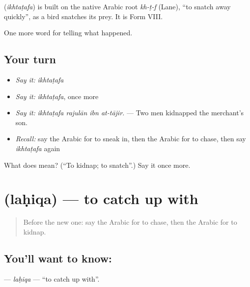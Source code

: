 \begin{cousinweb}
\textbf{} (\emph{ikhtaṭafa}) is built on the native Arabic root \emph{kh-ṭ-f} (Lane), \textquotedblleft{}to snatch away quickly\textquotedblright{}, as a bird snatches its prey. It is Form VIII.
\end{cousinweb}

\begin{grammarlens}[title={What you've built}]
One more word for telling what happened.
\end{grammarlens}

\subsection*{Your turn}
\begin{itemize}
\raggedright
  \item \emph{Say it:} \emph{ikhtaṭafa}
  \item \emph{Say it:} \emph{ikhtaṭafa}, once more
  \item \emph{Say it:} \emph{ikhtaṭafa rajulān ibn at-tājir.} — Two men kidnapped the merchant’s son.
  \item \emph{Recall:} say the Arabic for to sneak in, then the Arabic for to chase, then say \emph{ikhtaṭafa} again
\end{itemize}

\begin{tcolorbox}[breakable,colback=teal!4,colframe=teal!35!black,title={Before you move on}]
What does  mean? (\textquotedblleft{}To kidnap; to snatch\textquotedblright{}.) Say it once more.
\end{tcolorbox}
\section[\texorpdfstring{\ar{لحق} (laḥiqa)}{لحق (laḥiqa)}]{ (laḥiqa) — to catch up with}

\label{lesson:AR-C347-lahiqa}



\begin{quote}
Before the new one: say the Arabic for to chase, then the Arabic for to kidnap.
\end{quote}

\subsection*{You'll want to know: }
\textbf{} — \emph{laḥiqa} — \textquotedblleft{}to catch up with\textquotedblright{}.

